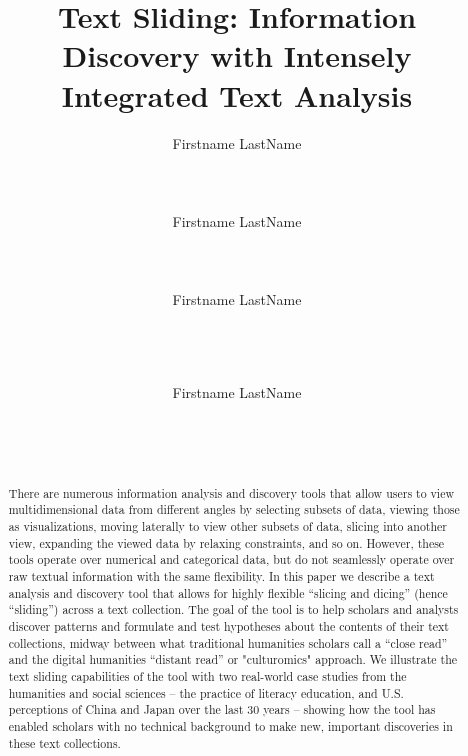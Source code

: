 \documentclass{sig-alternate}
\begin{document}
\title{Text Sliding: Information Discovery with Intensely Integrated Text Analysis}

\author{%
\alignauthor Firstname LastName\\
       \\
       \\
       \\
\alignauthor Firstname LastName\\
       \\
       \\
       \\
\alignauthor Firstname LastName\\
       \\
       \\
       \\
\and
\alignauthor Firstname LastName\\
       \\
       \\
       \\
}

\maketitle

\begin{abstract}
There are numerous information analysis and discovery tools that allow users to view multidimensional data from different angles by selecting subsets of data, viewing those as visualizations, moving laterally to view other subsets of data, slicing into another view, expanding the viewed data by relaxing constraints, and so on.  However, these tools operate over numerical and categorical data, but do not seamlessly operate over raw textual information with the same flexibility. In this paper we describe a text analysis and discovery tool that allows for highly flexible  ``slicing and dicing'' (hence  ``sliding'') across a text collection.  The goal of the tool is to help scholars and analysts discover patterns and formulate and test hypotheses about the contents of their text collections, midway between what traditional humanities scholars call a  ``close read'' and the digital humanities  ``distant read'' or "culturomics" approach.  We illustrate the text sliding capabilities of the tool with two real-world case studies from the humanities and social sciences -- the practice of literacy education, and U.S. perceptions of China and Japan over the last 30 years -- showing how the tool has enabled scholars with no technical background to make new, important discoveries in these text collections.

\end{abstract}
\end{document}
